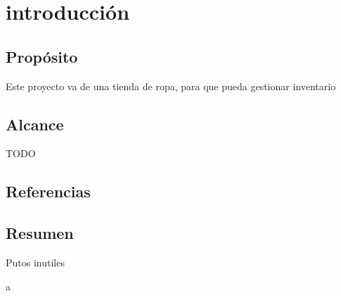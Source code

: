 \section{introducción}
\subsection{Propósito}
Este proyecto va de una tienda de ropa, para que pueda gestionar inventario
\subsection{Alcance}
TODO
\glsaddall
\nocite{*}
{
    \printglossary[title=Definiciones\, acrónimos y abreviaturas, numberedsection]}

\subsection{Referencias}
\subsection{Resumen}
Putos inutiles



a
